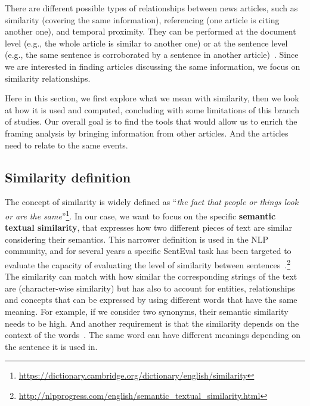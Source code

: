 There are different possible types of relationships between news articles, such as similarity (covering the same information), referencing (one article is citing another one), and temporal proximity. They can be performed at the document level (e.g., the whole article is similar to another one) or at the sentence level (e.g., the same sentence is corroborated by a sentence in another article)~\cite{bountouridis2018explaining}. %
Since we are interested in finding articles discussing the same information, we focus on similarity relationships.

Here in this section, we first explore what we mean with similarity, then we look at how it is used and computed, concluding with some limitations of this branch of studies.
Our overall goal is to find the tools that would allow us to enrich the framing analysis by bringing information from other articles. And the articles need to relate to the same events.

\subsection{Similarity definition}

The concept of similarity is widely defined as ``\emph{the fact that people or things look or are the same}''\footnote{\url{https://dictionary.cambridge.org/dictionary/english/similarity}}. In our case, we want to focus on the specific \textbf{semantic textual similarity}, that expresses how two different pieces of text are similar considering their semantics.
This narrower definition is used in the NLP community, and for several years a specific SentEval task has been targeted to evaluate the capacity of evaluating the level of similarity between sentences~\cite{conneau-kiela-2018-senteval}.\footnote{\url{http://nlpprogress.com/english/semantic\_textual\_similarity.html}}
The similarity can match with how similar the corresponding strings of the text are (character-wise similarity) but has also to account for entities, relationships and concepts that can be expressed by using different words that have the same meaning.
For example, if we consider two synonyms, their semantic similarity needs to be high. 
And another requirement is that the similarity depends on the context of the words~\cite{miller1991contextual}. The same word can have different meanings depending on the sentence it is used in.

